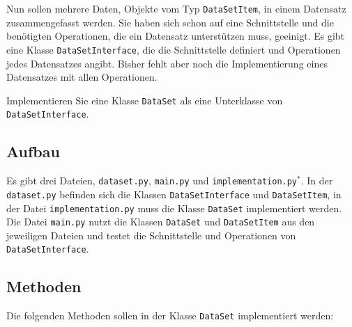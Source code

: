 \documentclass[
    11pt,     
    a4paper,     
    parskip=full
]{article}
\begin{document}
            Nun sollen mehrere Daten, Objekte vom Typ \texttt{Data\-Set\-Item}, in einem Datensatz zusammengefasst werden.
            Sie haben sich schon auf eine Schnittstelle und die benötigten Operationen, die ein Datensatz unterstützen muss, geeinigt.
            Es gibt eine Klasse \texttt{Data\-Set\-Interface}, die die Schnittstelle definiert und Operationen jedes Datensatzes angibt.
            Bisher fehlt aber noch die Implementierung eines Datensatzes mit allen Operationen.
        
            Implementieren Sie eine Klasse \texttt{Data\-Set} als eine Unterklasse von \texttt{Data\-Set\-Interface}.
            
        
        \subsection{Aufbau}
            Es gibt drei Dateien, \texttt{dataset.py}, \texttt{main.py} und \texttt{implementation.py}$^*$.
            In der \texttt{dataset.py} befinden sich die Klassen \texttt{Data\-Set\-Interface} und \texttt{Data\-Set\-Item},
            in der Datei \texttt{implementation.py} muss die Klasse \texttt{Data\-Set} implementiert werden.
            Die Datei \texttt{main.py} nutzt die Klassen \texttt{Data\-Set} und \texttt{Data\-Set\-Item} aus den jeweiligen Dateien und testet die Schnittstelle und Operationen von \texttt{Data\-Set\-Interface}.
            
        \subsection{Methoden}
            Die folgenden Methoden sollen in der Klasse \texttt{Data\-Set} implementiert werden:
    
\end{document}
